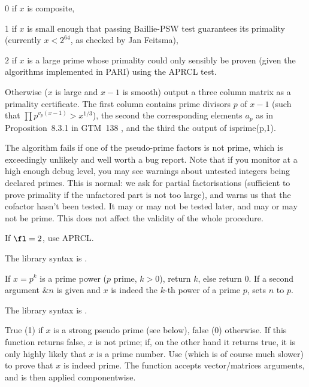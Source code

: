 \item 0 if $x$ is composite,

\item 1 if $x$ is small enough that passing Baillie-PSW test guarantees
its primality (currently $x < 2^{64}$, as checked by Jan Feitsma),

\item $2$ if $x$ is a large prime whose primality could only sensibly be
proven (given the algorithms implemented in PARI) using the APRCL test.

\item Otherwise ($x$ is large and $x-1$ is smooth) output a three column
matrix as a primality certificate. The first column contains prime
divisors $p$ of $x-1$ (such that $\prod p^{v_p(x-1)} > x^{1/3}$), the second
the corresponding elements $a_p$ as in Proposition~8.3.1 in GTM~138 , and the
third the output of isprime(p,1).

The algorithm fails if one of the pseudo-prime factors is not prime, which is
exceedingly unlikely and well worth a bug report. Note that if you monitor
 at a high enough debug level, you may see warnings about
untested integers being declared primes. This is normal: we ask for partial
factorisations (sufficient to prove primality if the unfactored part is not
too large), and  warns us that the cofactor hasn't been tested.
It may or may not be tested later, and may or may not be prime. This does
not affect the validity of the whole  procedure.

If $\fl=2$, use APRCL.

The library syntax is .

\label{se:isprimepower}
If $x = p^k$ is a prime power ($p$ prime, $k > 0$), return $k$, else
return 0. If a second argument $\&n$ is given and $x$ is indeed
the $k$-th power of a prime $p$, sets $n$ to $p$.

The library syntax is .

\label{se:ispseudoprime}
True (1) if $x$ is a strong pseudo
prime (see below), false (0) otherwise. If this function returns false, $x$
is not prime; if, on the other hand it returns true, it is only highly likely
that $x$ is a prime number. Use  (which is of course much
slower) to prove that $x$ is indeed prime.
The function accepts vector/matrices arguments, and is then applied
componentwise.

